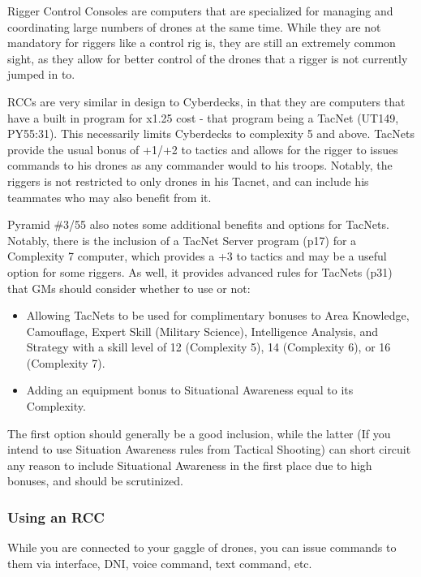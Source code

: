 \begin{multicols*}{3}
	Rigger Control Consoles are computers that are specialized for managing and coordinating large numbers of drones at the same time. While they are not mandatory for riggers like a control rig is, they are still an extremely common sight, as they allow for better control of the drones that a rigger is not currently jumped in to.
	
	RCCs are very similar in design to Cyberdecks, in that they are computers that have a built in program for x1.25 cost - that program being a TacNet (UT149, PY55:31). This necessarily limits Cyberdecks to complexity 5 and above. TacNets provide the usual bonus of +1/+2 to tactics and allows for the rigger to issues commands to his drones as any commander would to his troops. Notably, the riggers is not restricted to only drones in his Tacnet, and can include his teammates who may also benefit from it.
	
	Pyramid \#3/55 also notes some additional benefits and options for TacNets. Notably, there is the inclusion of a TacNet Server program (p17) for a Complexity 7 computer, which provides a +3 to tactics and may be a useful option for some riggers. As well, it provides advanced rules for TacNets (p31) that GMs should consider whether to use or not:
	
	\begin{itemize}
		\itemsep 0pt
		\item Allowing TacNets to be used for complimentary bonuses to Area Knowledge, Camouflage, Expert Skill (Military Science), Intelligence Analysis, and Strategy with a skill level of 12 (Complexity 5), 14 (Complexity 6), or 16 (Complexity 7).
		\item Adding an equipment bonus to Situational Awareness equal to its Complexity.
	\end{itemize}
	
	The first option should generally be a good inclusion, while the latter (If you intend to use Situation Awareness rules from Tactical Shooting) can short circuit any reason to include Situational Awareness in the first place due to high bonuses, and should be scrutinized.
	
	\subsubsection{Using an RCC}
	
	While you are connected to your gaggle of drones, you can issue commands to them via interface, DNI, voice command, text command, etc. 
	

\end{multicols*}
